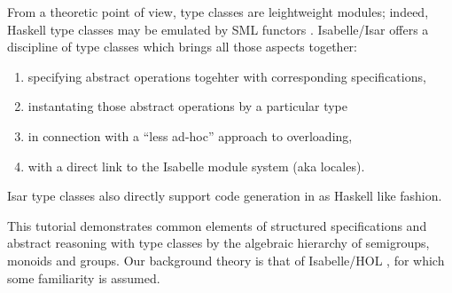 \begin{isabellebody}
\begin{isamarkuptext}
  \medskip From a theoretic point of view, type classes are leightweight
  modules; indeed, Haskell type classes may be emulated by
  SML functors \cite{classes_modules}. 
  Isabelle/Isar offers a discipline of type classes which brings
  all those aspects together:

  \begin{enumerate}
    \item specifying abstract operations togehter with
       corresponding specifications,
    \item instantating those abstract operations by a particular
       type
    \item in connection with a ``less ad-hoc'' approach to overloading,
    \item with a direct link to the Isabelle module system (aka locales).
  \end{enumerate}

  Isar type classes also directly support code generation
  in as Haskell like fashion.

  This tutorial demonstrates common elements of structured specifications
  and abstract reasoning with type classes by the algebraic hierarchy of
  semigroups, monoids and groups.  Our background theory is that of
  Isabelle/HOL \cite{Nipkow-et-al:2002:tutorial}, for which some
  familiarity is assumed.


\end{isamarkuptext}
\end{isabellebody}
